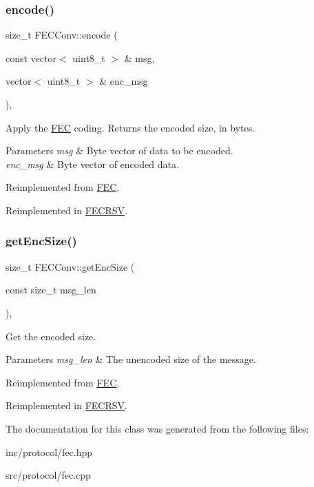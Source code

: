 \subsubsection{\texorpdfstring{encode()}{encode()}}
{\footnotesize\ttfamily size\+\_\+t F\+E\+C\+Conv\+::encode (\begin{DoxyParamCaption}\item[{const vector$<$ uint8\+\_\+t $>$ \&}]{msg,  }\item[{vector$<$ uint8\+\_\+t $>$ \&}]{enc\+\_\+msg }\end{DoxyParamCaption})\hspace{0.3cm}{\ttfamily [inline]}, {\ttfamily [virtual]}}

Apply the \hyperlink{classFEC}{F\+EC} coding. Returns the encoded size, in bytes. 
\begin{DoxyParams}{Parameters}
{\em msg} & Byte vector of data to be encoded. \\
\hline
{\em enc\+\_\+msg} & Byte vector of encoded data. \\
\hline
\end{DoxyParams}


Reimplemented from \hyperlink{classFEC_abc86f45390c50b3cd90cade73a137355}{F\+EC}.



Reimplemented in \hyperlink{classFECRSV_ac9bd3fe4c494067e6f24a1287b0c562e}{F\+E\+C\+R\+SV}.

\mbox{\label{classFECConv_a3b49acf69440d2677e3181513b9f3592}} 
\subsubsection{\texorpdfstring{get\+Enc\+Size()}{getEncSize()}}
{\footnotesize\ttfamily size\+\_\+t F\+E\+C\+Conv\+::get\+Enc\+Size (\begin{DoxyParamCaption}\item[{const size\+\_\+t}]{msg\+\_\+len }\end{DoxyParamCaption})\hspace{0.3cm}{\ttfamily [inline]}, {\ttfamily [virtual]}}

Get the encoded size. 
\begin{DoxyParams}{Parameters}
{\em msg\+\_\+len} & The unencoded size of the message. \\
\hline
\end{DoxyParams}


Reimplemented from \hyperlink{classFEC_a6504a5f7d5e1344538c25ed5481d0adb}{F\+EC}.



Reimplemented in \hyperlink{classFECRSV_a62fb01c152dad2e043ae75bbacfd928c}{F\+E\+C\+R\+SV}.



The documentation for this class was generated from the following files\+:\begin{DoxyCompactItemize}
\item 
inc/protocol/fec.\+hpp\item 
src/protocol/fec.\+cpp\end{DoxyCompactItemize}
